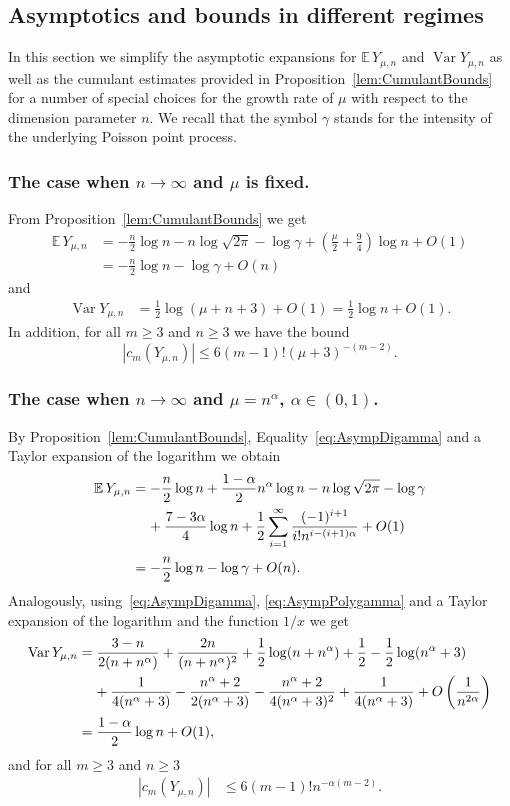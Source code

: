 \documentclass[10pt]{amsart}
\theoremstyle{definition}\newtheorem{defi}[theo]{Definition}\newtheorem{rema}[theo]{Remark}\newtheorem{exam}[theo]{Example}\newtheorem{exem}[theo]{Example}\newtheorem{nota}[theo]{Notation}
\newcommand{\EE}{\mathbb{E}\,}
\newcommand{\Var}{\mathop{\mathrm{Var}}\nolimits}
\begin{document}
\subsection{Asymptotics and bounds in different regimes}\label{subsec:CumSpecial}

In this section we simplify the asymptotic expansions for $\EE Y_{\mu,n}$ and $\Var Y_{\mu,n}$ as well as the cumulant estimates provided in Proposition~\ref{lem:CumulantBounds} for a number of special choices for the growth rate of $\mu$ with respect to the dimension parameter $n$. We recall that the symbol $\gamma$ stands for the intensity of the underlying Poisson point process.

\subsubsection{The case when $n\rightarrow \infty$ and $\mu$ is fixed.}
From Proposition~\ref{lem:CumulantBounds} we get
\begin{align*}
\EE Y_{\mu,n}&=-\frac{n}{2}\log n-n\log\sqrt{2\pi}-\log\gamma +\left(\frac{\mu}{2}+\frac{9}{4}\right)\log n+O(1)\\
&= -\frac{n}{2}\log n-\log\gamma+O(n)
\end{align*}
and
\begin{align*}
\Var Y_{\mu,n}&=\frac12\log(\mu+n+3)+O(1)= \frac12\log n+O(1).
\end{align*}
In addition, for all $m\geq 3$ and $n\ge 3$ we have the bound
\[
|c_m(Y_{\mu,n})|\leq 6(m-1)!(\mu+3)^{-(m-2)}.
\]

\subsubsection{The case when $n\rightarrow \infty$ and $\mu=n^{\alpha}$, $\alpha \in (0,1)$.}
By Proposition~\ref{lem:CumulantBounds}, Equality~\eqref{eq:AsympDigamma} and a Taylor expansion of the logarithm we obtain
\begin{align*}
\EE Y_{\mu,n}&=-\frac{n}{2}\log n+\frac{1-\alpha}{2}n^{\alpha}\log n-n\log\sqrt{2\pi}-\log\gamma\\
&\mkern20mu +\frac{7-3\alpha}{4}\log n+\frac12\sum\limits_{i=1}^{\infty}\frac{(-1)^{i+1}}{i!n^{i-(i+1)\alpha}}+O(1)\\[0.20em]
&= -\frac{n}{2}\log n-\log\gamma + O(n).
\end{align*}
Analogously, using~\eqref{eq:AsympDigamma}, \eqref{eq:AsympPolygamma} and a Taylor expansion of the logarithm and the function $1/x$ we get
\begin{align*}
\Var Y_{\mu,n}&=\frac{3-n}{2(n+n^\alpha)}+\frac{2n}{(n+n^\alpha)^2}+\frac{1}{2}\log(n+n^\alpha)+\frac{1}{2}-\frac{1}{2}\log(n^\alpha+3)\\
&\mkern20mu+\frac{1}{4(n^\alpha+3)}-\frac{n^\alpha+2}{2(n^\alpha+3)}-\frac{n^\alpha+2}{4(n^\alpha+3)^2}+\frac{1}{4(n^\alpha+3)}+O\left(\frac{1}{n^{2\alpha}}\right)\\[0.20em]
&=\frac{1-\alpha}{2}\log n+ O(1),
\end{align*}
and for all $m\geq 3$ and $n\geq 3$
\begin{align*}
|c_m(Y_{\mu,n})|&\leq 6(m-1)!n^{-\alpha(m-2)}.
\end{align*}
\end{document}

